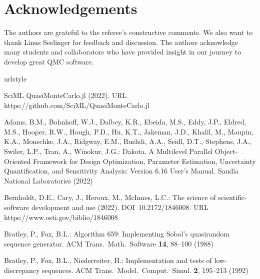\documentclass[graybox]{svmult}
\begin{document}
\section*{Acknowledgements}
The authors are grateful to the referee's constructive comments. We also want to thank Linus Seelinger for feedback and discussion. The authors acknowledge many students and collaborators who have provided insight in our journey to develop great QMC software.


%
%

\begin{thebibliography}{10}
	\providecommand{\url}[1]{{#1}}
	\providecommand{\urlprefix}{URL }
	\expandafter\ifx\csname urlstyle\endcsname\relax
	\providecommand{\doi}[1]{DOI~\discretionary{}{}{}#1}\else
	\providecommand{\doi}{DOI~\discretionary{}{}{}\begingroup
		\urlstyle{rm}\Url}\fi

	{SciML QuasiMonteCarlo.jl} (2022).
	\newblock \urlprefix\url{https://github.com/SciML/QuasiMonteCarlo.jl}

	Adams, B.M., Bohnhoff, W.J., Dalbey, K.R., Ebeida, M.S., Eddy, J.P., Eldred,
	M.S., Hooper, R.W., Hough, P.D., Hu, K.T., Jakeman, J.D., Khalil, M., Maupin,
	K.A., Monschke, J.A., Ridgway, E.M., Rushdi, A.A., Seidl, D.T., Stephens,
	J.A., Swiler, L.P., Tran, A., Winokur, J.G.: Dakota, A Multilevel Parallel
	Object-Oriented Framework for Design Optimization, Parameter Estimation,
	Uncertainty Quantification, and Sensitivity Analysis: Version 6.16 User's
	Manual.
	\newblock Sandia National Laboratories (2022)

	Bernholdt, D.E., Cary, J., Heroux, M., McInnes, L.C.: The science of
	scientific-software development and use  (2022).
	\newblock \doi{10.2172/1846008}.
	\newblock \urlprefix\url{https://www.osti.gov/biblio/1846008}

	Bratley, P., Fox, B.L.: Algorithm 659: Implementing {Sobol's} quasirandom
	sequence generator.
	\newblock ACM Trans.\ Math.\ Software \textbf{14}, 88--100 (1988)

	Bratley, P., Fox, B.L., Niederreiter, H.: Implementation and tests of
	low-discrepancy sequences.
	\newblock ACM Trans.\ Model.\ Comput.\ Simul. \textbf{2}, 195--213 (1992)


\end{thebibliography}
\end{document}
